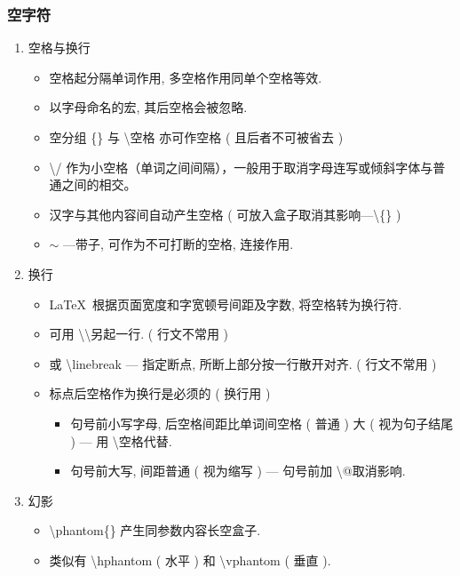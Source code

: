 \documentclass[UTF8]{ctexart}
\begin{document}
        \subsubsection{空字符}

            \begin{enumerate}

                \item 空格与换行
                \begin{itemize}
                    \item 空格起分隔单词作用, 多空格作用同单个空格等效. 
                    \item 以字母命名的宏, 其后空格会被忽略. 
                    \item 空分组 \{\} 与 \textbackslash 空格 亦可作空格 ( 且后者不可被省去 )
                    \item \textbackslash/ 作为小空格（单词之间间隔），一般用于取消字母连写或倾斜字体与普通之间的相交。
                    \item 汉字与其他内容间自动产生空格 ( 可放入盒子取消其影响---\textbackslash \{\} )
                    \item $\sim$ ---带子, 可作为不可打断的空格, 连接作用. 
                \end{itemize}

                \item 换行
                \begin{itemize}
                    \item \LaTeX\ 根据页面宽度和字宽顿号间距及字数, 将空格转为换行符. 
                    \item 可用 \textbackslash\textbackslash 另起一行. ( 行文不常用 )
                    \item 或 \textbackslash linebreak --- 指定断点, 所断上部分按一行散开对齐. ( 行文不常用 )
                    \item 标点后空格作为换行是必须的 ( 换行用 )
                    \begin{itemize}
                        \item 句号前小写字母, 后空格间距比单词间空格 ( 普通 ) 大 ( 视为句子结尾 ) --- 用 \textbackslash 空格代替. 
                        \item 句号前大写, 间距普通 ( 视为缩写 ) --- 句号前加 \textbackslash @取消影响. 
                    \end{itemize}
                \end{itemize}

                \item 幻影
                \begin{itemize}
                    \item \textbackslash phantom\{\} 产生同参数内容长空盒子.
                    \item 类似有 \textbackslash hphantom ( 水平 ) 和 \textbackslash vphantom ( 垂直 ). 
                \end{itemize}

            \end{enumerate}
\end{document}
